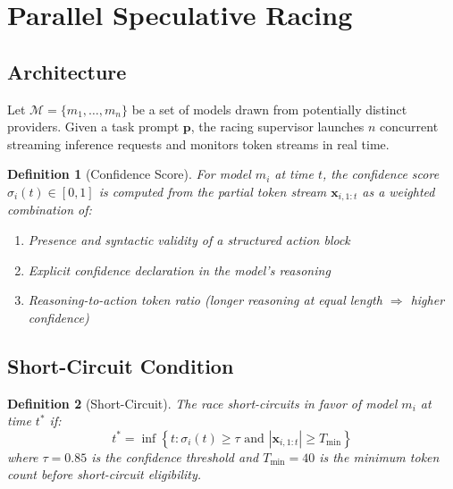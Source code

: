 \documentclass[11pt,twocolumn]{article}
\newtheorem{definition}{Definition}
\begin{document}
\section{Parallel Speculative Racing}
\label{sec:racing}

\subsection{Architecture}

Let $\mathcal{M} = \{m_1, \ldots, m_n\}$ be a set of models drawn from potentially
distinct providers. Given a task prompt $\mathbf{p}$, the racing supervisor launches
$n$ concurrent streaming inference requests and monitors token streams in real time.

\begin{definition}[Confidence Score]
For model $m_i$ at time $t$, the confidence score $\sigma_i(t) \in [0,1]$ is computed
from the partial token stream $\mathbf{x}_{i,1:t}$ as a weighted combination of:
\begin{enumerate}
  \item Presence and syntactic validity of a structured action block
  \item Explicit confidence declaration in the model's reasoning
  \item Reasoning-to-action token ratio (longer reasoning at equal length $\Rightarrow$ higher confidence)
\end{enumerate}
\end{definition}

\subsection{Short-Circuit Condition}

\begin{definition}[Short-Circuit]
The race short-circuits in favor of model $m_i$ at time $t^*$ if:
\begin{equation}
  t^* = \inf\left\{t : \sigma_i(t) \geq \tau \text{ and } |\mathbf{x}_{i,1:t}| \geq T_{\min}\right\}
  \label{eq:shortcircuit}
\end{equation}
where $\tau = 0.85$ is the confidence threshold and $T_{\min} = 40$ is the minimum
token count before short-circuit eligibility.
\end{definition}
\end{document}
